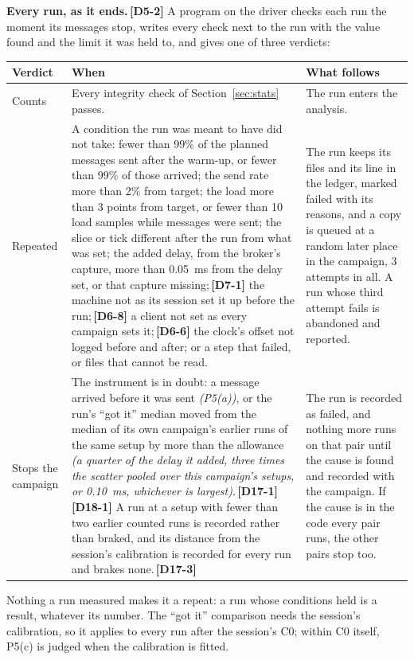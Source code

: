 \documentclass[11pt]{article}
\newcommand{\gl}[1]{{\color{soft}\itshape\small (#1)}}
\newcommand{\chgold}[1]{\,{\color{oldcol}\bfseries\footnotesize[#1]}}
\begin{document}
\textbf{Every run, as it ends.}\chgold{D5-2} A program on the driver checks each run the moment its messages stop, writes every check next to the run with the value found and the limit it was held to, and gives one of three verdicts:
{\small
\begin{longtable}{@{}>{\raggedright\arraybackslash}p{2.1cm} >{\raggedright\arraybackslash}p{8.3cm} >{\raggedright\arraybackslash}p{5.4cm}@{}}
\toprule
\textbf{Verdict} & \textbf{When} & \textbf{What follows} \\
\midrule
\endhead
Counts & Every integrity check of Section~\ref{sec:stats} passes. & The run enters the analysis. \\
Repeated & A condition the run was meant to have did not take: fewer than 99\% of the planned messages sent after the warm-up, or fewer than 99\% of those arrived; the send rate more than 2\% from target; the load more than 3 points from target, or fewer than 10 load samples while messages were sent; the slice or tick different after the run from what was set; the added delay, from the broker's capture, more than 0.05~ms from the delay set, or that capture missing;\chgold{D7-1} the machine not as its session set it up before the run;\chgold{D6-8} a client not set as every campaign sets it;\chgold{D6-6} the clock's offset not logged before and after; or a step that failed, or files that cannot be read. & The run keeps its files and its line in the ledger, marked failed with its reasons, and a copy is queued at a random later place in the campaign, 3 attempts in all. A run whose third attempt fails is abandoned and reported. \\
Stops the campaign & The instrument is in doubt: a message arrived before it was sent \gl{P5(a)}, or the run's ``got it'' median moved from the median of its own campaign's earlier runs of the same setup by more than the allowance \gl{a quarter of the delay it added, three times the scatter pooled over this campaign's setups, or 0.10~ms, whichever is largest}.\chgold{D17-1}\chgold{D18-1} A run at a setup with fewer than two earlier counted runs is recorded rather than braked, and its distance from the session's calibration is recorded for every run and brakes none.\chgold{D17-3} & The run is recorded as failed, and nothing more runs on that pair until the cause is found and recorded with the campaign. If the cause is in the code every pair runs, the other pairs stop too. \\
\bottomrule
\end{longtable}}
Nothing a run measured makes it a repeat: a run whose conditions held is a result, whatever its number. The ``got it'' comparison needs the session's calibration, so it applies to every run after the session's C0; within C0 itself, P5(c) is judged when the calibration is fitted.
\end{document}
